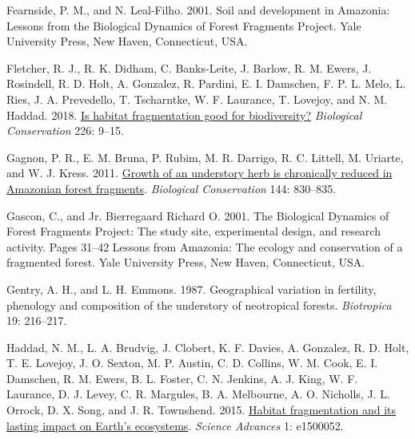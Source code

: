 \documentclass[
  12pt,
  man, donotrepeattitle]{apa6}
\newlength{\cslhangindent}
\newlength{\cslentryspacingunit} %
\newenvironment{CSLReferences}[2] %
 {%
  \setlength{\parindent}{0pt}
  \ifodd #1
  \let\oldpar\par
  \def\par{\hangindent=\cslhangindent\oldpar}
  \fi
  \setlength{\parskip}{#2\cslentryspacingunit}
 }%
 {}
\begin{document}
\begin{CSLReferences}{1}{0}
\leavevmode{}%
Fearnside, P. M., and N. Leal-Filho. 2001. Soil and development in {Amazonia}: {Lessons} from the {Biological} {Dynamics} of {Forest} {Fragments} {Project}. Yale University Press, New Haven, Connecticut, USA.

\leavevmode{}%
Fletcher, R. J., R. K. Didham, C. Banks-Leite, J. Barlow, R. M. Ewers, J. Rosindell, R. D. Holt, A. Gonzalez, R. Pardini, E. I. Damschen, F. P. L. Melo, L. Ries, J. A. Prevedello, T. Tscharntke, W. F. Laurance, T. Lovejoy, and N. M. Haddad. 2018. \href{https://doi.org/10.1016/j.biocon.2018.07.022}{Is habitat fragmentation good for biodiversity?} \emph{Biological Conservation} 226: 9--15.

\leavevmode{}%
Gagnon, P. R., E. M. Bruna, P. Rubim, M. R. Darrigo, R. C. Littell, M. Uriarte, and W. J. Kress. 2011. \href{https://doi.org/10.1016/j.biocon.2010.11.015}{Growth of an understory herb is chronically reduced in {Amazonian} forest fragments}. \emph{Biological Conservation} 144: 830--835.

\leavevmode{}%
Gascon, C., and Jr. Bierregaard Richard O. 2001. The {Biological} {Dynamics} of {Forest} {Fragments} {Project}: The study site, experimental design, and research activity. Pages 31--42 Lessons from {Amazonia}: The ecology and conservation of a fragmented forest. Yale University Press, New Haven, Connecticut, USA.

\leavevmode{}%
Gentry, A. H., and L. H. Emmons. 1987. Geographical variation in fertility, phenology and composition of the understory of neotropical forests. \emph{Biotropica} 19: 216--217.

\leavevmode{}%
Haddad, N. M., L. A. Brudvig, J. Clobert, K. F. Davies, A. Gonzalez, R. D. Holt, T. E. Lovejoy, J. O. Sexton, M. P. Austin, C. D. Collins, W. M. Cook, E. I. Damschen, R. M. Ewers, B. L. Foster, C. N. Jenkins, A. J. King, W. F. Laurance, D. J. Levey, C. R. Margules, B. A. Melbourne, A. O. Nicholls, J. L. Orrock, D. X. Song, and J. R. Townshend. 2015. \href{https://doi.org/10.1126/sciadv.1500052}{Habitat fragmentation and its lasting impact on {Earth}'s ecosystems}. \emph{Science Advances} 1: e1500052.


\end{CSLReferences}
\end{document}
